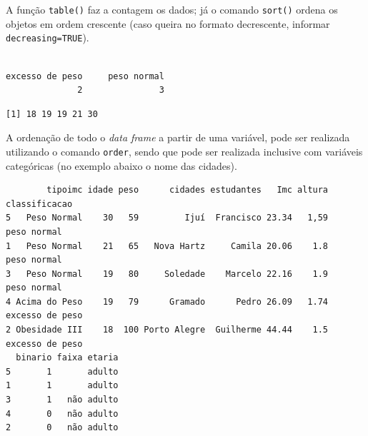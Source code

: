 \documentclass[12pt,brazil,oneside]{book}
\newenvironment{Shaded}{\begin{snugshade}}{\end{snugshade}}
\newcommand{\CommentTok}[1]{\textcolor[rgb]{0.56,0.35,0.01}{\textit{#1}}}
\newcommand{\DataTypeTok}[1]{\textcolor[rgb]{0.13,0.29,0.53}{#1}}
\newcommand{\KeywordTok}[1]{\textcolor[rgb]{0.13,0.29,0.53}{\textbf{#1}}}
\newcommand{\NormalTok}[1]{#1}
\newcommand{\OperatorTok}[1]{\textcolor[rgb]{0.81,0.36,0.00}{\textbf{#1}}}
\newcommand{\OtherTok}[1]{\textcolor[rgb]{0.56,0.35,0.01}{#1}}
\begin{document}
A função \texttt{table()} faz a contagem os dados; já o comando \texttt{sort()} ordena os objetos em ordem crescente (caso queira no formato decrescente, informar \texttt{decreasing=TRUE}).

\begin{Shaded}
\end{Shaded}

\begin{verbatim}

excesso de peso     peso normal 
              2               3 
\end{verbatim}

\begin{Shaded}
\end{Shaded}

\begin{verbatim}
[1] 18 19 19 21 30
\end{verbatim}

A ordenação de todo o \emph{data frame} a partir de uma variável, pode ser realizada utilizando o comando \texttt{order}, sendo que pode ser realizada inclusive com variáveis categóricas (no exemplo abaixo o nome das cidades).

\begin{Shaded}
\end{Shaded}

\begin{verbatim}
        tipoimc idade peso      cidades estudantes   Imc altura   classificacao
5   Peso Normal    30   59         Ijuí  Francisco 23.34   1,59     peso normal
1   Peso Normal    21   65   Nova Hartz     Camila 20.06    1.8     peso normal
3   Peso Normal    19   80     Soledade    Marcelo 22.16    1.9     peso normal
4 Acima do Peso    19   79      Gramado      Pedro 26.09   1.74 excesso de peso
2 Obesidade III    18  100 Porto Alegre  Guilherme 44.44    1.5 excesso de peso
  binario faixa etaria
5       1       adulto
1       1       adulto
3       1   não adulto
4       0   não adulto
2       0   não adulto
\end{verbatim}
\end{document}
